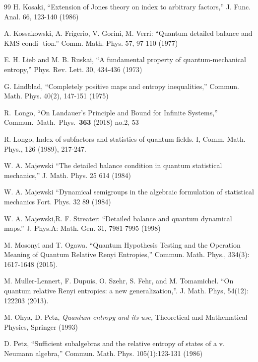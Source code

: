 \documentclass[english,a4paper,12pt]{article}
\begin{document}
\begin{thebibliography}{99}
  H. Kosaki, ``Extension of Jones theory on index to arbitrary factors,'' J. Func. Anal. 66, 123-140 (1986)
  
 A. Kossakowski, A. Frigerio, V. Gorini, M. Verri: ``Quantum detailed balance and KMS condi-
tion.'' Comm. Math. Phys. 57, 97-110 (1977)
  
  E. H. Lieb and M. B. Ruskai, ``A fundamental property of quantum-mechanical entropy,'' Phys. Rev. Lett. 30, 434-436 (1973)
  
  G. Lindblad, ``Completely positive maps and entropy inequalities,'' Commun. Math. Phys. 40(2), 147-151 (1975)
  
  
  R.~Longo,
  ``On Landauer's Principle and Bound for Infinite Systems,''
  Commun.\ Math.\ Phys.\  {\bf 363} (2018) no.2,  53
  
  R. Longo, Index of subfactors and statistics of quantum fields. I, Comm. Math. Phys., 126 (1989), 217-247.
  
  W. A. Majewski ``The detailed balance condition in quantum statistical mechanics,'' J. Math. Phys. 25 614 (1984)
  
 W. A. Majewski ``Dynamical semigroups in the algebraic formulation of statistical mechanics Fort. Phys.
32 89 (1984)
  
  W. A. Majewski,R. F. Streater: ``Detailed balance and quantum dynamical maps.'' J. Phys.A: Math. Gen. 31,
7981-7995 (1998)
  
  M. Mosonyi and T. Ogawa. ``Quantum Hypothesis Testing and the Operation Meaning of Quantum Relative Renyi Entropies,''
  Commun. Math. Phys., 334(3): 1617-1648 (2015).
  
  M. Muller-Lennert, F. Dupuis, O. Szehr, S. Fehr, and M. Tomamichel. ``On quantum relative Renyi entropies: a new generalization,''. 
  J. Math. Phys, 54(12): 122203 (2013).
  
  M. Ohya, D. Petz, {\em Quantum entropy and its use,}
Theoretical and Mathematical Physics,
Springer (1993)
  
 D. Petz, ``Sufficient subalgebras and the relative entropy of states of a v. Neumann algebra,'' Commun. Math. Phys. 105(1):123-131 (1986)
 

\end{thebibliography}
\end{document}
